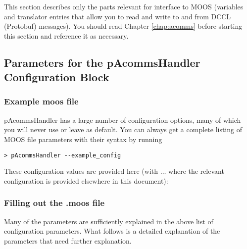 This section describes only the parts relevant for interface to MOOS (variables and translator entries that allow you to read and write to and from DCCL (Protobuf) messages). You should read Chapter \ref{chap:acomms} before starting this section and reference it as necessary.

\subsection{Parameters for the pAcommsHandler Configuration Block}\label{sec:pAcommsHandler:config}

\subsubsection{Example moos file}

pAcommsHandler has a large number of configuration options, many of which you will never use or leave as default. You can always get a complete listing of MOOS file parameters with their syntax by running
\begin{verbatim}
> pAcommsHandler --example_config
\end{verbatim}
\resetbvlinenumber

These configuration values are provided here (with $\ldots$ where the relevant configuration is provided elsewhere in this document):

\resetbvlinenumber


\subsubsection{Filling out the .moos file}\label{sec:pAcommsHandler_moos_file}

Many of the parameters are sufficiently explained in the above list of configuration parameters. What follows is a detailed explanation of the parameters that need further explanation.

